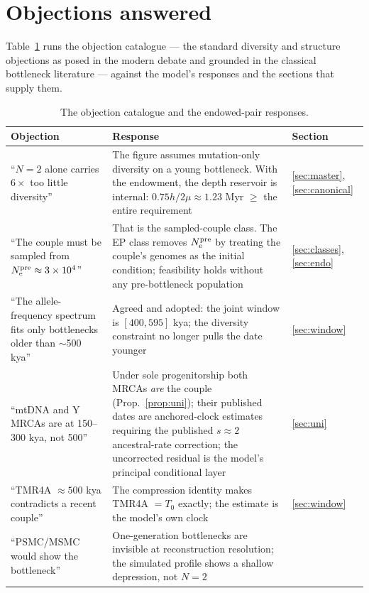 \section{Objections answered}\label{sec:objections}

Table~\ref{tab:objections} runs the objection catalogue --- the standard
diversity and structure objections as posed in the modern debate
\citep{Gauger2012,Swamidass2019} and grounded in the classical bottleneck
literature \citep{Nei1975,Ayala1995} --- against the model's responses and
the sections that supply them.

\begin{table}[t]
\centering\small
\caption{The objection catalogue and the endowed-pair responses.}
\label{tab:objections}
\begin{tabular}{p{4.6cm}p{6.4cm}p{4.2cm}}
\toprule
Objection & Response & Section \\
\midrule
``$N=2$ alone carries $6\times$ too little diversity'' &
The figure assumes mutation-only diversity on a young bottleneck. With
the endowment, the depth reservoir is internal: $0.75h/2\mu \approx
1.23$ Myr $\ge$ the entire requirement &
\ref{sec:master}, \ref{sec:canonical} \\
``The couple must be sampled from
$N_{\mathrm{e}}^{\mathrm{pre}} \approx 3\times10^4$'' &
That is the sampled-couple class. The EP class removes $N_{\mathrm{e}}^{\mathrm{pre}}$ by
treating the couple's genomes as the initial condition; feasibility
holds without any pre-bottleneck population &
\ref{sec:classes}, \ref{sec:endo} \\
``The allele-frequency spectrum fits
only bottlenecks older than $\sim$500 kya'' &
Agreed and adopted: the joint window is $[400, 595]$ kya; the
diversity constraint no longer pulls the date younger &
\ref{sec:window} \\
``mtDNA and Y MRCAs are at 150--300
kya, not 500'' &
Under sole progenitorship both MRCAs \emph{are} the couple
(Prop.~\ref{prop:uni}); their published dates are anchored-clock
estimates requiring the published $s \approx 2$ ancestral-rate
correction; the uncorrected residual is the model's principal
conditional layer &
\ref{sec:uni} \\
``TMR4A $\approx 500$ kya contradicts a
recent couple'' &
The compression identity makes TMR4A $= T_0$ exactly; the estimate is
the model's own clock &
\ref{sec:window} \\
``PSMC/MSMC would show the bottleneck'' &
One-generation bottlenecks are invisible at reconstruction resolution;
the simulated profile shows a shallow depression, not $N=2$ &

\end{tabular}
\end{table}
